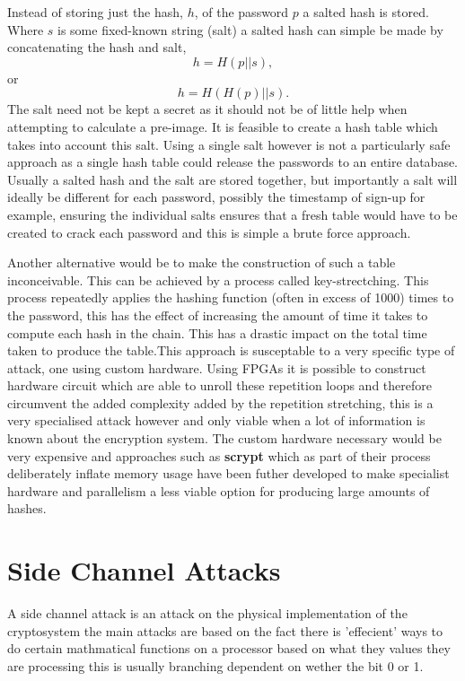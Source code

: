 \documentclass[a4paper,12pt]{article}
\begin{document}
Instead of storing just the hash, $h$, of the password $p$ a salted hash is stored. Where $s$ is some fixed-known string (salt) a salted hash can simple be made by concatenating the hash and salt, $$h = H(p||s),$$ or $$h = H(H(p) || s).$$
The salt need not be kept a secret as it should not be of little help when attempting to calculate a pre-image. It is feasible to create a hash table which takes into account this salt. Using a single salt however is not a particularly safe approach as a single hash table could release the passwords to an entire database. Usually a salted hash and the salt are stored together, but importantly a salt will ideally be different for each password, possibly the timestamp of sign-up for example, ensuring the individual salts ensures that a fresh table would have to be created to crack each password and this is simple a brute force approach.

Another alternative would be to make the construction of such a table inconceivable. This can be achieved by a process called key-strectching. This process repeatedly applies the hashing function (often in excess of 1000) times to the password, this has the effect of increasing the amount of time it takes to compute each hash in the chain. This has a drastic impact on the total time taken to produce the table.This approach is susceptable to a very specific type of attack, one using custom hardware. 
Using FPGAs it is possible to construct hardware circuit which are able to unroll these repetition loops and therefore circumvent the added complexity added by the repetition stretching, this is a very specialised attack however and only viable when a lot of information is known about the encryption system. The custom hardware necessary would be very expensive and approaches such as \textbf{scrypt}\cite{colin} which as part of their process deliberately inflate memory usage have been futher developed to make specialist hardware and parallelism a less viable option for producing large amounts of hashes.



\section{Side Channel Attacks}
A side channel attack is an attack on the physical implementation of the cryptosystem the main attacks are based on the fact there is 'effecient' ways to do certain mathmatical functions on a processor based on what they values they are processing this is usually branching dependent on wether the bit 0 or 1. 
\end{document}

